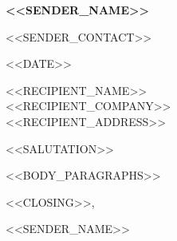 \documentclass[11pt]{article} %
\begin{document}
\begin{center}
	\begin{minipage}{0.5\textwidth}
		{\Huge\bfseries
			<<SENDER_NAME>>
		}
	\end{minipage} \hfill
	\begin{minipage}{0.4\textwidth}
		\raggedleft
		<<SENDER_CONTACT>>
	\end{minipage}
\end{center}
\vspace{2em}

\noindent <<DATE>>

\vspace{2em}
\noindent <<RECIPIENT_NAME>> \\
<<RECIPIENT_COMPANY>> \\
<<RECIPIENT_ADDRESS>>

\vspace{2em}
\noindent <<SALUTATION>>

\vspace{1em}
<<BODY_PARAGRAPHS>>

\vspace{2em}
\noindent <<CLOSING>>,

\vspace{2em}
\noindent <<SENDER_NAME>>
\end{document}
